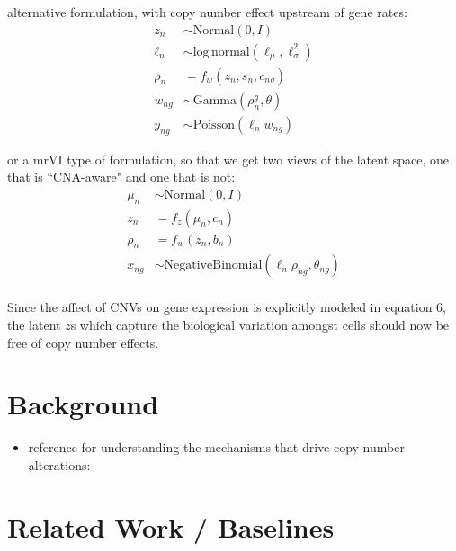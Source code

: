 \documentclass{article}
\begin{document}
alternative formulation, with copy number effect upstream of gene rates:
\begin{align}%
{z_n} & {\sim {\mathrm{Normal}}\left( {0,I} \right)} \\ 
{\ell _n} & {\sim {\mathrm{log}}\,{\mathrm{normal}}\left( {\ell _\mu ,\ell _\sigma ^2} \right)} \\ 
{\rho _n} & { = f_w\left( {z_n,s_n,c_{ng}} \right)} \\ 
{w_{ng}} & {\sim {\mathrm{Gamma}}\left( {\rho _n^g,\theta } \right)} \\ 
{y_{ng}} & {\sim {\mathrm{Poisson}}\left( {\ell _nw_{ng}} \right)}
\end{align}

or a mrVI type of formulation, so that we get two views of the latent space, one that is ``CNA-aware" and one that is not:
\begin{align}%
{\mu_n} & {\sim {\mathrm{Normal}}\left( {0,I} \right)} \\ 
{z_n} &= f_z(\mu_n, c_{n})\\
{\rho _n} & { = f_w\left( {z_n,b_n} \right)} \\ 
{x_{ng}} & {\sim {\mathrm{Negative Binomial}}\left({\ell _n \rho_{ng}, \theta_{ng}}\right)} \\ 
\end{align}

Since the affect of CNVs on gene expression is explicitly modeled in equation 6, the latent $z$s which capture the biological variation amongst cells should now be free of copy number effects.

\section{Background}
\begin{itemize}
    \item reference for understanding the mechanisms that drive copy number alterations: \cite{hastings2009mechanisms}
\end{itemize}

\section{Related Work / Baselines}
\end{document}

